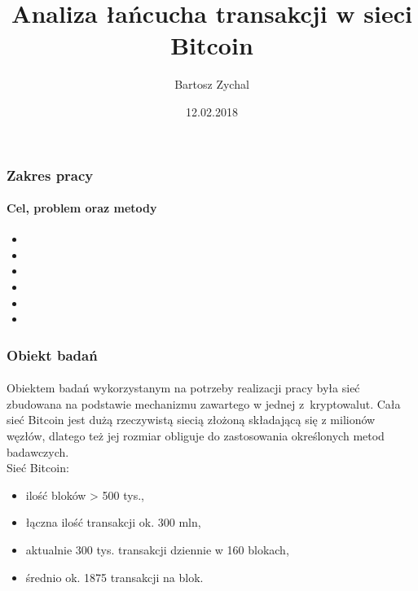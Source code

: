 \documentclass[]{beamer}
\begin{document}
\title{Analiza łańcucha transakcji w sieci Bitcoin}
\subtitle{}
\author{Bartosz Zychal}
\keywords{}
\subject{}
\date{12.02.2018}

\begin{frame}[plain]
 \titlepage
\end{frame}

\begin{frame}
 \frametitle{Zakres pracy}
 \framesubtitle{Cel, problem oraz metody}
 \begin{itemize}
 	\item {\par}
 	\item {\par}
	\item {\par}
	\item {\par}
	\item {\par}
	\item {\par}
 \end{itemize}
\end{frame}

\begin{frame}
 \frametitle{Obiekt badań}
 \framesubtitle{}
 \justify
Obiektem badań wykorzystanym na potrzeby realizacji pracy była sieć zbudowana na podstawie mechanizmu zawartego w jednej z~kryptowalut. Cała sieć Bitcoin jest dużą rzeczywistą siecią złożoną składającą się z milionów węzłów, dlatego też jej rozmiar obliguje do zastosowania określonych metod badawczych.
\\Sieć Bitcoin:
\begin{itemize}
\item ilość bloków > 500 tys.,
\item łączna ilość transakcji ok. 300 mln,
\item aktualnie 300 tys. transakcji dziennie w 160 blokach,
\item średnio ok. 1875 transakcji na blok.
\end{itemize}
\end{frame}
\end{document}
